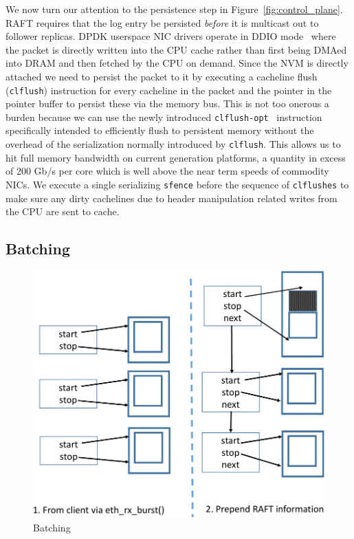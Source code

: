 \documentclass[pageno]{jpaper}
\begin{document}
We now turn our attention to the persistence step in
Figure~\ref{fig:control_plane}. RAFT requires that the log entry be persisted
\emph{before} it is multicast out to follower replicas. DPDK userspace NIC
drivers operate in DDIO mode~\cite{ddio} where the packet is directly written
into the CPU cache rather than first being DMAed into DRAM and then fetched by
the CPU on demand. Since the NVM is directly attached we need to persist the
packet to it by executing a cacheline flush ({\tt clflush}) instruction for
every cacheline in the packet and the pointer in the pointer buffer to persist
these via the memory bus. This is not too onerous a burden because we can use
the newly introduced {\tt clflush-opt}~\cite{clflush_opt} instruction
specifically intended to efficiently flush to persistent memory without the
overhead of the serialization normally introduced by {\tt clflush}. This allows
us to hit full memory bandwidth on current generation platforms, a quantity in
excess of 200 Gb/s per core which is well above the near term speeds of 
commodity NICs. We execute a single serializing {\tt sfence} 
before the sequence of {\tt clflushes} to make sure any dirty cachelines due to
header manipulation related writes from the CPU are sent to cache.

\subsection{Batching}

\begin{figure}
  \centering
  \includegraphics[scale=0.4]{figures2/batching.pdf}
  \caption{Batching}
  \label{fig:batching}
\end{figure}
\end{document}
